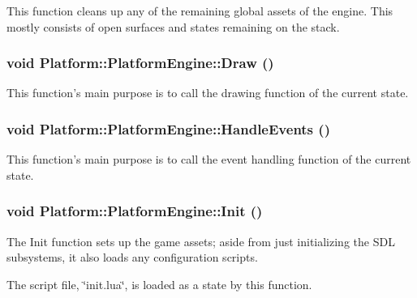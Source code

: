 This function cleans up any of the remaining global assets of the engine. This mostly consists of open surfaces and states remaining on the stack. \hypertarget{class_platform_1_1_platform_engine_af99d3e57733259edd6ffd727c9141e7}{
\subsubsection[{Draw}]{\setlength{\rightskip}{0pt plus 5cm}void Platform::PlatformEngine::Draw ()}}
\label{d2/dd5/class_platform_1_1_platform_engine_af99d3e57733259edd6ffd727c9141e7}


This function's main purpose is to call the drawing function of the current state. \hypertarget{class_platform_1_1_platform_engine_ced86dc9266db718d80eec4a61f26c7d}{
\subsubsection[{HandleEvents}]{\setlength{\rightskip}{0pt plus 5cm}void Platform::PlatformEngine::HandleEvents ()}}
\label{d2/dd5/class_platform_1_1_platform_engine_ced86dc9266db718d80eec4a61f26c7d}


This function's main purpose is to call the event handling function of the current state. \hypertarget{class_platform_1_1_platform_engine_8745a9f24dcbb112506321f2ae8bb79b}{
\subsubsection[{Init}]{\setlength{\rightskip}{0pt plus 5cm}void Platform::PlatformEngine::Init ()}}
\label{d2/dd5/class_platform_1_1_platform_engine_8745a9f24dcbb112506321f2ae8bb79b}


The Init function sets up the game assets; aside from just initializing the SDL subsystems, it also loads any configuration scripts. 

The script file, \char`\"{}init.lua\char`\"{}, is loaded as a state by this function.

